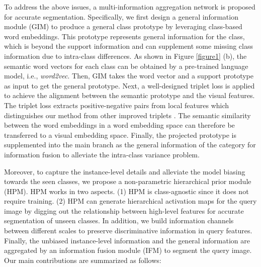 \documentclass[10pt,twocolumn,letterpaper]{article}
\begin{document}
To address the above issues, a multi-information aggregation network is proposed for accurate segmentation. Specifically, we first design a general information module (GIM) to produce a general class prototype by leveraging class-based word embeddings. This prototype represents general information for the class, which is beyond the support information and can supplement some missing class information due to intra-class differences. As shown in Figure \ref{figure1} (b), the semantic word vectors for each class can be obtained by a pre-trained language model, i.e., \textit{word2vec}. Then, GIM takes the word vector and a support prototype as input to get the general prototype. Next, a well-designed triplet loss \cite{facenet} is applied to achieve the alignment between the semantic prototype and the visual features. The triplet loss extracts positive-negative pairs from local features which distinguishes our method from other improved triplets \cite{improved,quadruplet,indefense}. The semantic similarity between the word embeddings in a word embedding space can therefore be transferred to a visual embedding space. Finally, the projected prototype is supplemented into the main branch as the general information of the category for information fusion to alleviate the intra-class variance problem.\par
Moreover, to capture the instance-level details and alleviate the model biasing towards the seen classes, we propose a non-parametric hierarchical prior module (HPM). HPM works in two aspects. (1) HPM is class-agnostic since it does not require training. (2) HPM can generate hierarchical activation maps for the query image by digging out the relationship between high-level features for accurate segmentation of unseen classes. In addition, we build information channels between different scales to preserve discriminative information in query features. Finally, the unbiased instance-level information and the general information are aggregated by an information fusion module (IFM) to segment the query image. Our main contributions are summarized as follows: 
\end{document}

